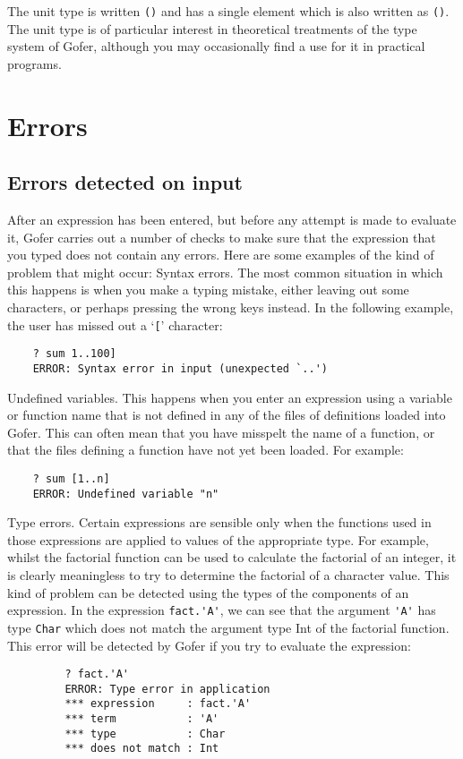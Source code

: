 The unit type is written \verb"()" and has a  single  element  which  is  also
written as \verb"()".  The unit type is of particular interest in  theoretical
treatments of the type system of Gofer, although you  may  occasionally
find a use for it in practical programs.


\chapter{Errors}

\section{Errors detected on input}
After an expression has been entered, but before any attempt is made to
evaluate it, Gofer carries out a number of checks to make sure that the
expression that you typed does not contain any errors.  Here  are  some
examples of the kind of problem that might occur:
\BI
\IT  Syntax errors.  The most common situation in which this happens is
     when  you  make  a  typing  mistake,  either  leaving   out   some
     characters, or perhaps pressing the wrong keys  instead.   In  the
     following example, the user has missed out a `\verb"["' character:
\begin{verbatim}
    ? sum 1..100]
    ERROR: Syntax error in input (unexpected `..')
\end{verbatim}
\IT  Undefined variables.  This happens when you  enter  an  expression
     using a variable or function name that is not defined  in  any  of
     the files of definitions loaded into Gofer.  This can  often  mean
     that you have misspelt the name of a function, or that  the  files
     defining a function have not yet been loaded.  For example:
\begin{verbatim}
    ? sum [1..n]
    ERROR: Undefined variable "n"
\end{verbatim}
\IT  Type errors.  Certain  expressions  are  sensible  only  when  the
     functions used in those expressions are applied to values  of  the
     appropriate type.  For example, whilst the factorial function  can
     be used to calculate the factorial of an integer,  it  is  clearly
     meaningless to try to  determine  the  factorial  of  a  character
     value.  This kind of problem can be detected using  the  types  of
     the components of an expression.  In the expression \verb"fact.'A'", we
     can see that the argument \verb"'A'" has type \verb"Char"
     which does  not  match
     the argument type Int of the factorial function.  This error  will
     be detected by Gofer if you try to evaluate the expression:
\begin{verbatim}
         ? fact.'A'
         ERROR: Type error in application
         *** expression     : fact.'A'
         *** term           : 'A'
         *** type           : Char
         *** does not match : Int
\end{verbatim}
\EI

